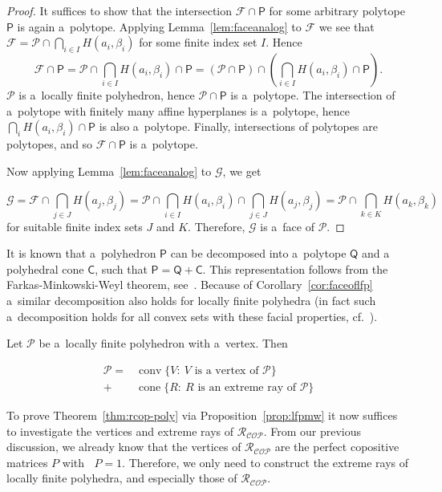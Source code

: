 \documentclass{commat}
\newcommand{\sR}{\mathcal{R}}
\DeclareMathOperator{\cone}{cone}
\DeclareMathOperator{\conv}{conv}
\newcommand{\cop}{{\mathcal{COP}}}
\DeclareMathOperator{\minC}{min_{\cop}}
\newcommand{\lfp}{\mathcal{P}}
\newcommand{\lfpfacef}{\mathcal{F}}
\newcommand{\lfpfaceg}{\mathcal{G}}
\newcommand{\polyh}{\mathsf{P}}
\begin{document}
\begin{proof}
    It suffices to show that the intersection \(\lfpfacef\cap\polyh \) for some arbitrary polytope
	\(\polyh \) is again a~polytope.
    Applying Lemma~\ref{lem:faceanalog} to \(\lfpfacef \) we see that
	\(\lfpfacef=\lfp\cap\bigcap_{i\in I}H(a_i,\beta_i) \) for some finite index set $I$.
    Hence
    \[
        \lfpfacef\cap\polyh=\lfp\cap\bigcap_{i\in I}H(a_i,\beta_i)\cap\polyh=
		(\lfp\cap\polyh)\cap\left(\bigcap_{i\in I}H(a_i,\beta_i)\cap\polyh\right).
    \]
    \(\lfp \) is a~locally finite polyhedron, hence \(\lfp\cap\polyh \) is a~polytope.
    The intersection of a~polytope with finitely many affine hyperplanes is a~polytope,
	hence \(\bigcap_{i}H(a_i,\beta_i)\cap\polyh \) is also a~polytope.
    Finally, intersections of polytopes are polytopes, and so \(\lfpfacef\cap\polyh \) is a~polytope.

    Now applying Lemma~\ref{lem:faceanalog} to \(\lfpfaceg \), we get
	
\[
		\lfpfaceg=\lfpfacef\cap\bigcap_{j\in J}H(a_j,\beta_j)=
		\lfp\cap\bigcap_{i\in I}H(a_i,\beta_i)\cap\bigcap_{j\in J}H(a_j,\beta_j)=
		\lfp\cap\bigcap_{k\in K}H(a_k,\beta_k)
\]
	for suitable finite index sets $J$ and $K$.
    Therefore, \(\lfpfaceg \) is a~face of \(\lfp \).
\end{proof}

It is known that a~polyhedron \(\polyh \) can be decomposed into a~polytope \(\mathsf{Q} \) and a~
polyhedral cone \(\mathsf{C} \), such that \(\polyh=\mathsf{Q}+\mathsf{C} \).
This representation follows from the Farkas-Minkowski-Weyl theorem, see~\cite[Section 7.2]{schrijver-1986}.
Because of Corollary~\ref{cor:faceoflfp} a~similar decomposition also holds for locally finite polyhedra
(in fact such a~decomposition holds for all convex sets with these facial properties,
cf.~\cite[Theorem 18.5, 18.7]{rockafellar-1970}).
\begin{proposition}\label{prop:lfpmw}
	Let \(\lfp \) be a~locally finite polyhedron with a~vertex.
	Then
	
\begin{align}\label{eq:lfprepresentation}
			\lfp =& \conv\big\{ V:\ V \text{ is a~vertex of } \lfp \big\} \\
			 +& \cone\big\{ R :\ R \text{ is an extreme ray of } \lfp \big\} \nonumber
\end{align}
\end{proposition}
To prove Theorem~\ref{thm:rcop-poly} via Proposition~\ref{prop:lfpmw} it now suffices to investigate
the vertices and extreme rays of \(\sR_\cop \).
From our previous discussion, we already know that the vertices of \(\sR_\cop \) are the perfect
copositive matrices $P$ with \(\minC P=1 \).
Therefore, we only need to construct the extreme rays of locally finite polyhedra,
and especially those of \(\sR_\cop \).
\end{document}
